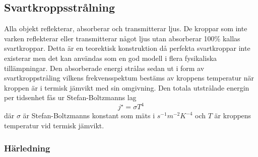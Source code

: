 \subsection{Svartkroppsstrålning}

Alla objekt reflekterar, absorberar och transmitterar ljus. De kroppar som inte varken reflekterar eller transmitterar något ljus utan absorberar 100\% kallas svartkroppar. Detta är en teorektisk konstruktion då perfekta svartkroppar inte existerar men det kan användas som en god modell i flera fysikaliska tillämpningar. Den absorberade energi strålas sedan ut i form av svartkroppstråling vilkens frekvensspektum bestäms av kroppens temperatur när kroppen är i termisk jämvikt med sin omgivning. Den totala utstrålade energin per tidsenhet fås ur Stefan-Boltzmanns lag
\begin{equation}
j^{\star} = \sigma T^{4}
\end{equation}
\noindent
där $\sigma$ är Stefan-Boltzmanns konstant som mäts i $\unit{s^{-1}m^{-2}K^{-4}}$ och $T$ är kroppens temperatur vid termisk jämvikt.

\subsubsection{Härledning}

   
